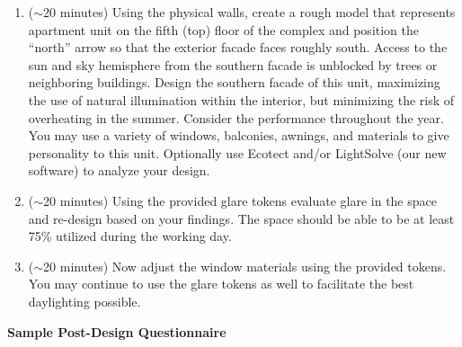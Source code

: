 \documentclass[10pt]{article}
\begin{document}
\begin{enumerate}

\item ($\sim$20 minutes) Using the physical walls, create a rough
  model that represents apartment unit on the fifth (top) floor of the
  complex and position the ``north'' arrow so that the exterior facade
  faces roughly south.  Access to the sun and sky hemisphere from the
  southern facade is unblocked by trees or neighboring buildings.
  Design the southern facade of this unit, maximizing the use of
  natural illumination within the interior, but minimizing the risk of
  overheating in the summer.  Consider the performance throughout the
  year.  You may use a variety of windows, balconies, awnings, and
  materials to give personality to this unit.  Optionally use Ecotect
  and/or LightSolve (our new software) to analyze your design.

\item ($\sim$20 minutes) Using the provided glare tokens evaluate glare in
  the space and re-design based on your findings.  The space should be able to be 
  at least 75\% utilized during the working day.  

\item ($\sim$20 minutes) Now adjust the window materials using the provided tokens.
  You may continue to use the glare tokens as well to facilitate the best daylighting possible.

\end{enumerate}


\newpage

\noindent
{\bf {\Large Sample Post-Design Questionnaire}}

\vspace{0.1in}
\end{document}

